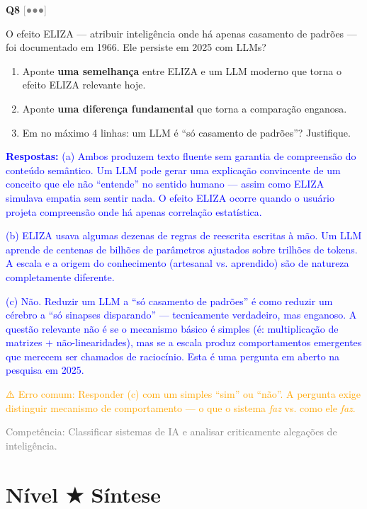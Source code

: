 \documentclass[12pt,a4paper]{article}
\newcommand{\sol}[1]{\textcolor{blue}{#1}}
\newcommand{\errocomum}[1]{\textcolor{orange}{⚠️ Erro comum: #1}}
\newcommand{\competencia}[1]{\textcolor{gray}{Competência: #1}}
\newcommand{\sol}[1]{}
\newcommand{\errocomum}[1]{}
\newcommand{\competencia}[1]{}
\newcommand{\sol}[1]{}
\newcommand{\errocomum}[1]{}
\newcommand{\competencia}[1]{}
\newcommand{\nivel}[1]{\textcolor{gray}{[#1]}}
\newenvironment{questao}[2]{
  \vspace{0.5cm}
  \noindent\textbf{Q#1} \nivel{#2} \quad
}{
  \vspace{0.2cm}
}
\begin{document}
\begin{questao}{8}{●●●}
  O efeito ELIZA — atribuir inteligência onde há apenas casamento de padrões —
  foi documentado em 1966. Ele persiste em 2025 com LLMs?

  \begin{enumerate}[label=(\alph*),nosep]
    \item Aponte \textbf{uma semelhança} entre ELIZA e um LLM moderno que torna
    o efeito ELIZA relevante hoje.
    \item Aponte \textbf{uma diferença fundamental} que torna a comparação enganosa.
    \item Em no máximo 4 linhas: um LLM é ``só casamento de padrões''? Justifique.
  \end{enumerate}

  \sol{
    \textbf{Respostas:}
    (a) Ambos produzem texto fluente sem garantia de compreensão do conteúdo semântico.
    Um LLM pode gerar uma explicação convincente de um conceito que ele não ``entende''
    no sentido humano — assim como ELIZA simulava empatia sem sentir nada. O efeito
    ELIZA ocorre quando o usuário projeta compreensão onde há apenas correlação estatística.

    (b) ELIZA usava algumas dezenas de regras de reescrita escritas à mão. Um LLM aprende
    de centenas de bilhões de parâmetros ajustados sobre trilhões de tokens. A escala e
    a origem do conhecimento (artesanal vs. aprendido) são de natureza completamente diferente.

    (c) Não. Reduzir um LLM a ``só casamento de padrões'' é como reduzir um cérebro a
    ``só sinapses disparando'' — tecnicamente verdadeiro, mas enganoso. A questão relevante
    não é se o mecanismo básico é simples (é: multiplicação de matrizes + não-linearidades),
    mas se a escala produz comportamentos emergentes que merecem ser chamados de raciocínio.
    Esta é uma pergunta em aberto na pesquisa em 2025.

    \errocomum{Responder (c) com um simples ``sim'' ou ``não''. A pergunta exige distinguir
    mecanismo de comportamento — o que o sistema \textit{faz} vs. como ele \textit{faz}.}

    \competencia{Classificar sistemas de IA e analisar criticamente alegações de inteligência.}
  }
\end{questao}

\section*{Nível ★ \quad Síntese}
\end{document}
